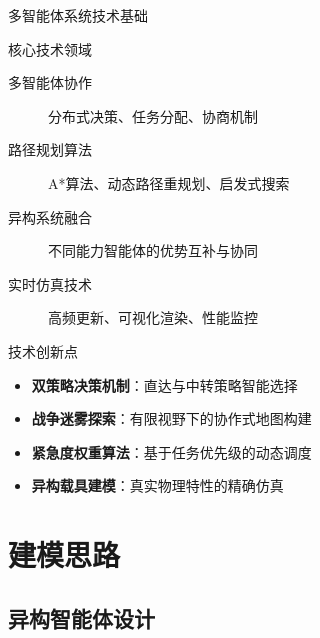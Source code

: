 \documentclass[
10pt,
aspectratio=169,
]{beamer}
\begin{document}
\begin{frame}{多智能体系统技术基础}
    \begin{block}{核心技术领域}
        \begin{description}
            \item[多智能体协作] 分布式决策、任务分配、协商机制
            \item[路径规划算法] A*算法、动态路径重规划、启发式搜索
            \item[异构系统融合] 不同能力智能体的优势互补与协同
            \item[实时仿真技术] 高频更新、可视化渲染、性能监控
        \end{description}
    \end{block}
    
    \begin{alertblock}{技术创新点}
        \begin{itemize}
            \item \textbf{双策略决策机制}：直达与中转策略智能选择
            \item \textbf{战争迷雾探索}：有限视野下的协作式地图构建
            \item \textbf{紧急度权重算法}：基于任务优先级的动态调度
            \item \textbf{异构载具建模}：真实物理特性的精确仿真
        \end{itemize}
    \end{alertblock}
\end{frame}


\section{建模思路}

\subsection{异构智能体设计}
\end{document}
